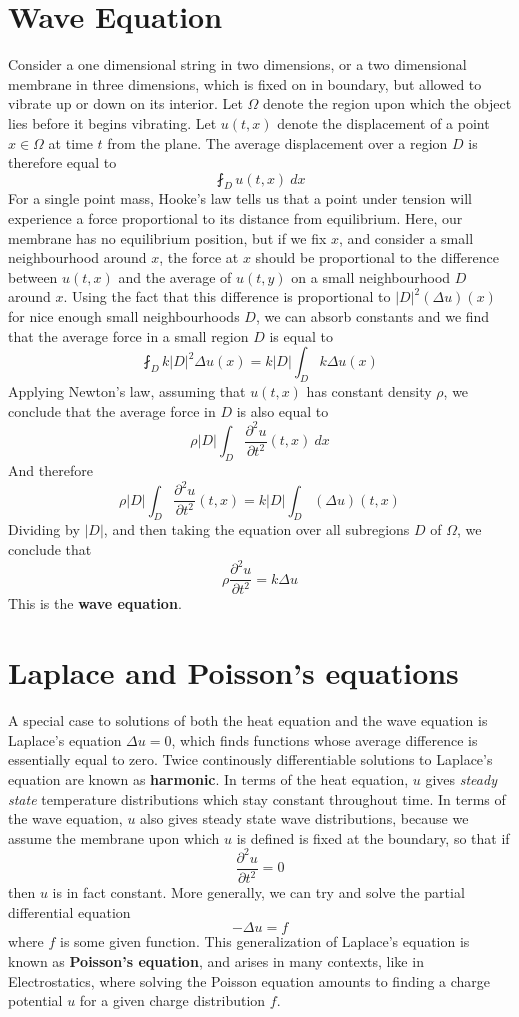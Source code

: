 \section{Wave Equation}

Consider a one dimensional string in two dimensions, or a two dimensional membrane in three dimensions, which is fixed on in boundary, but allowed to vibrate up or down on its interior. Let $\Omega$ denote the region upon which the object lies before it begins vibrating. Let $u(t,x)$ denote the displacement of a point $x \in \Omega$ at time $t$ from the plane. The average displacement over a region $D$ is therefore equal to
%
\[ \fint_D u(t,x)\ dx \]
%
For a single point mass, Hooke's law tells us that a point under tension will experience a force proportional to its distance from equilibrium. Here, our membrane has no equilibrium position, but if we fix $x$, and consider a small neighbourhood around $x$, the force at $x$ should be proportional to the difference between $u(t,x)$ and the average of $u(t,y)$ on a small neighbourhood $D$ around $x$. Using the fact that this difference is proportional to $|D|^2 (\Delta u)(x)$ for nice enough small neighbourhoods $D$, we can absorb constants and we find that the average force in a small region $D$ is equal to
%
\[ \fint_D k |D|^2 \Delta u(x) = k |D| \int_D k \Delta u(x) \]
%
Applying Newton's law, assuming that $u(t,x)$ has constant density $\rho$, we conclude that the average force in $D$ is also equal to
%
\[ \rho |D| \int_D \frac{\partial^2 u}{\partial t^2}(t,x) \ dx \]
%
And therefore
%
\[ \rho |D| \int_D \frac{\partial^2 u}{\partial t^2}(t,x) = k |D| \int_D (\Delta u)(t,x) \]
%
Dividing by $|D|$, and then taking the equation over all subregions $D$ of $\Omega$, we conclude that
%
\[ \rho \frac{\partial^2 u}{\partial t^2} = k \Delta u \]
%
This is the {\bf wave equation}.

\section{Laplace and Poisson's equations}

A special case to solutions of both the heat equation and the wave equation is Laplace's equation $\Delta u = 0$, which finds functions whose average difference is essentially equal to zero. Twice continously differentiable solutions to Laplace's equation are known as {\bf harmonic}. In terms of the heat equation, $u$ gives {\it steady state} temperature distributions which stay constant throughout time. In terms of the wave equation, $u$ also gives steady state wave distributions, because we assume the membrane upon which $u$ is defined is fixed at the boundary, so that if
%
\[ \frac{\partial^2 u}{\partial t^2} = 0 \]
%
then $u$ is in fact constant. More generally, we can try and solve the partial differential equation
%
\[ - \Delta u = f \]
%
where $f$ is some given function. This generalization of Laplace's equation is known as {\bf Poisson's equation}, and arises in many contexts, like in Electrostatics, where solving the Poisson equation amounts to finding a charge potential $u$ for a given charge distribution $f$.

